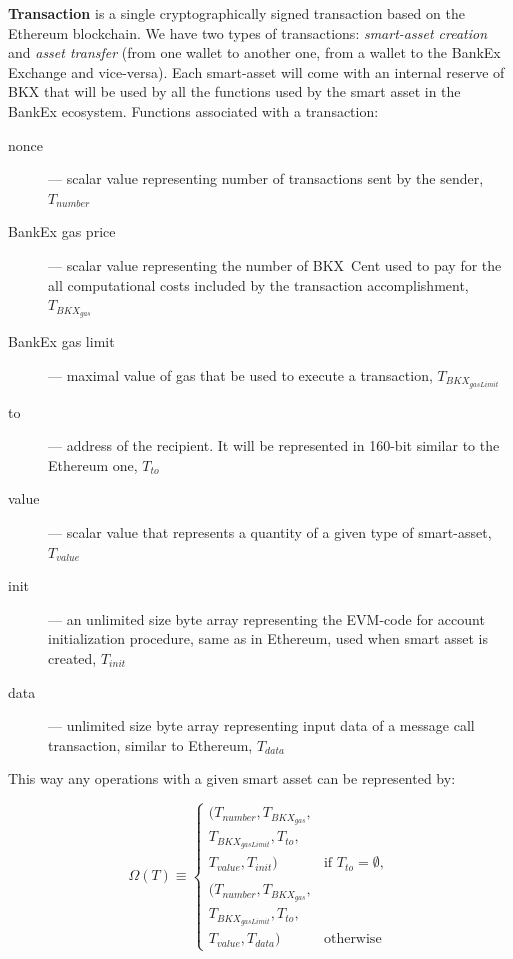 \documentclass{article}
\begin{document}
\textbf{Transaction} is a single cryptographically signed transaction based on the Ethereum blockchain. We have two types of transactions: \textit{smart-asset creation} and \textit{asset transfer} (from one wallet to another one, from a wallet to the BankEx Exchange and vice-versa). Each smart-asset will come with an internal reserve of BKX that will be used by all the functions used by the smart asset in the BankEx ecosystem. Functions associated with a transaction:

\begin{description}
\item[nonce]--- scalar value representing number of transactions sent by the sender, $T_{number}$
\item[BankEx gas price]--- scalar value representing the number of BKX~Cent used to pay for the all computational costs included by the transaction accomplishment, $T_{BKX_{gas}}$
\item[BankEx gas limit]--- maximal value of gas that be used to execute a transaction, $T_{BKX_{gasLimit}}$
\item[to]--- address of the recipient. It will be represented in 160-bit similar to the Ethereum one, $T_{to}$
\item[value]--- scalar value that represents a quantity of a given type of smart-asset, $T_{value}$
\item[init]--- an unlimited size byte array representing the EVM-code for account initialization procedure, same as in Ethereum, used when smart asset is created, $T_{init}$
\item[data]--- unlimited size byte array representing input data of a message call transaction, similar to Ethereum, $T_{data}$
\end{description}

This way any operations with a given smart asset can be represented by:

\begin{equation}
    \Omega(T) \equiv
    \begin{cases} 
        (T_{number}, T_{BKX_{gas}}, \\T_{BKX_{gasLimit}}, T_{to}, \\T_{value}, T_{init}) & \text{if } T_{to} = \emptyset, \\
        \\
        (T_{number}, T_{BKX_{gas}}, \\T_{BKX_{gasLimit}}, T_{to}, \\T_{value}, T_{data}) & \text{otherwise}
    \end{cases}
\end{equation}
\end{document}
